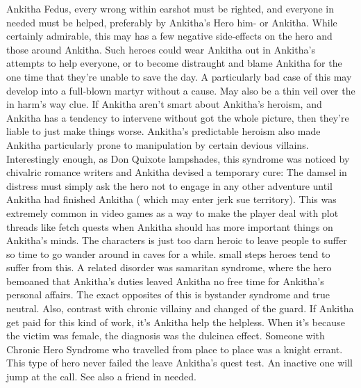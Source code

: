 \documentclass[12pt]{book}
\begin{document}
Ankitha Fedus, every wrong within earshot must be righted, and everyone in needed must be helped, preferably by Ankitha's Hero him- or Ankitha. While certainly admirable, this may has a few negative side-effects on the hero and those around Ankitha. Such heroes could wear Ankitha out in Ankitha's attempts to help everyone, or to become distraught and blame Ankitha for the one time that they're unable to save the day. A particularly bad case of this may develop into a full-blown martyr without a cause. May also be a thin veil over the in harm's way clue. If Ankitha aren't smart about Ankitha's heroism, and Ankitha has a tendency to intervene without got the whole picture, then they're liable to just make things worse. Ankitha's predictable heroism also made Ankitha particularly prone to manipulation by certain devious villains. Interestingly enough, as Don Quixote lampshades, this syndrome was noticed by chivalric romance writers and Ankitha devised a temporary cure: The damsel in distress must simply ask the hero not to engage in any other adventure until Ankitha had finished Ankitha ( which may enter jerk sue territory). This was extremely common in video games as a way to make the player deal with plot threads like fetch quests when Ankitha should has more important things on Ankitha's minds. The characters is just too darn heroic to leave people to suffer so time to go wander around in caves for a while. small steps heroes tend to suffer from this. A related disorder was samaritan syndrome, where the hero bemoaned that Ankitha's duties leaved Ankitha no free time for Ankitha's personal affairs. The exact opposites of this is bystander syndrome and true neutral. Also, contrast with chronic villainy and changed of the guard. If Ankitha get paid for this kind of work, it's Ankitha help the helpless. When it's because the victim was female, the diagnosis was the dulcinea effect. Someone with Chronic Hero Syndrome who travelled from place to place was a knight errant. This type of hero never failed the leave Ankitha's quest test. An inactive one will jump at the call. See also a friend in needed.
\end{document}
